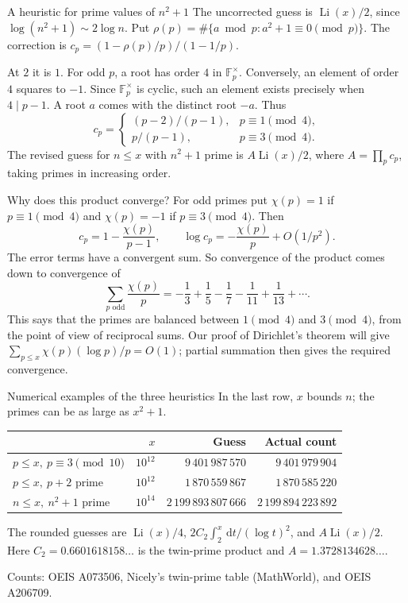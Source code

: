 \documentclass[aspectratio=169,11pt]{beamer}
\newcommand{\F}{\mathbb F}
\newcommand{\dd}{\,\mathrm d}
\begin{document}
\begin{frame}{A heuristic for prime values of $n^2+1$}
The uncorrected guess is $\operatorname{Li}(x)/2$, since $\log(n^2+1)\sim2\log n$. Put $\rho(p)=\#\{a\bmod p:a^2+1\equiv0\pmod p\}$. The correction is $c_p=(1-\rho(p)/p)/(1-1/p)$.

At $2$ it is $1$. For odd $p$, a root has order $4$ in $\F_p^\times$. Conversely, an element of order $4$ squares to $-1$. Since $\F_p^\times$ is cyclic, such an element exists precisely when $4\mid p-1$. A root $a$ comes with the distinct root $-a$. Thus
\[c_p=\begin{cases}(p-2)/(p-1),&p\equiv1\pmod4,\\p/(p-1),&p\equiv3\pmod4.\end{cases}\]
The revised guess for $n\le x$ with $n^2+1$ prime is $A\operatorname{Li}(x)/2$, where $A=\prod_pc_p$, taking primes in increasing order.
\end{frame}
\begin{frame}{Why does this product converge?}
For odd primes put $\chi(p)=1$ if $p\equiv1\pmod4$ and $\chi(p)=-1$ if $p\equiv3\pmod4$. Then
\[c_p=1-\frac{\chi(p)}{p-1},\qquad
\log c_p=-\frac{\chi(p)}p+O(1/p^2).\]
The error terms have a convergent sum. So convergence of the product comes down to convergence of
\[\sum_{p\text{ odd}}\frac{\chi(p)}p=-\frac13+\frac15-\frac17-\frac1{11}+\frac1{13}+\cdots.\]
This says that the primes are balanced between $1\pmod4$ and $3\pmod4$, from the point of view of reciprocal sums. Our proof of Dirichlet's theorem will give $\sum_{p\le x}\chi(p)(\log p)/p=O(1)$; partial summation then gives the required convergence.
\end{frame}
\begin{frame}{Numerical examples of the three heuristics}
In the last row, $x$ bounds $n$; the primes can be as large as $x^2+1$.
\begin{center}\scriptsize\begin{tabular}{lrrr}\toprule
&$x$&Guess&Actual count\\\midrule
$p\le x,\ p\equiv3\pmod{10}$&$10^{12}$&$9\,401\,987\,570$&$9\,401\,979\,904$\\
$p\le x,\ p+2\text{ prime}$&$10^{12}$&$1\,870\,559\,867$&$1\,870\,585\,220$\\
$n\le x,\ n^2+1\text{ prime}$&$10^{14}$&$2\,199\,893\,807\,666$&$2\,199\,894\,223\,892$\\\bottomrule
\end{tabular}\end{center}
The rounded guesses are $\operatorname{Li}(x)/4$, $2C_2\int_2^x\dd t/(\log t)^2$, and $A\operatorname{Li}(x)/2$. Here $C_2=0.6601618158\ldots$ is the twin-prime product and $A=1.3728134628\ldots$.

{\footnotesize Counts: OEIS A073506, Nicely's twin-prime table (MathWorld), and OEIS A206709.}
\end{frame}
\end{document}
